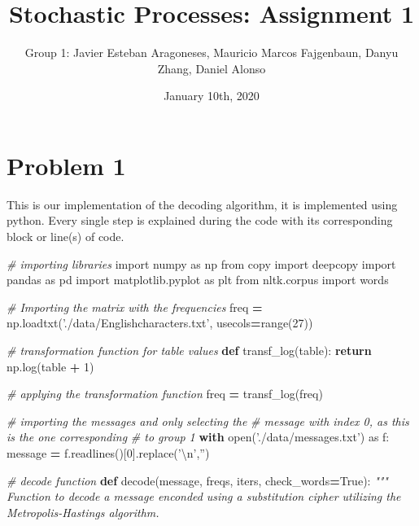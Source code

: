 \documentclass[]{article}
\title{Stochastic Processes: Assignment 1}
\author{Group 1: Javier Esteban Aragoneses, Mauricio Marcos Fajgenbaun, Danyu
Zhang, Daniel Alonso}
\date{January 10th, 2020}
\newenvironment{Shaded}{\begin{snugshade}}{\end{snugshade}}
\newcommand{\BuiltInTok}[1]{#1}
\newcommand{\CharTok}[1]{\textcolor[rgb]{0.31,0.60,0.02}{#1}}
\newcommand{\CommentTok}[1]{\textcolor[rgb]{0.56,0.35,0.01}{\textit{#1}}}
\newcommand{\ControlFlowTok}[1]{\textcolor[rgb]{0.13,0.29,0.53}{\textbf{#1}}}
\newcommand{\DecValTok}[1]{\textcolor[rgb]{0.00,0.00,0.81}{#1}}
\newcommand{\ImportTok}[1]{#1}
\newcommand{\KeywordTok}[1]{\textcolor[rgb]{0.13,0.29,0.53}{\textbf{#1}}}
\newcommand{\NormalTok}[1]{#1}
\newcommand{\OperatorTok}[1]{\textcolor[rgb]{0.81,0.36,0.00}{\textbf{#1}}}
\newcommand{\StringTok}[1]{\textcolor[rgb]{0.31,0.60,0.02}{#1}}
\newcommand{\VariableTok}[1]{\textcolor[rgb]{0.00,0.00,0.00}{#1}}
\begin{document}
\maketitle

\hypertarget{problem-1}{%
\section{Problem 1}\label{problem-1}}

This is our implementation of the decoding algorithm, it is implemented
using python. Every single step is explained during the code with its
corresponding block or line(s) of code.

\begin{Shaded}
\begin{Highlighting}[]
\CommentTok{# importing libraries}
\ImportTok{import}\NormalTok{ numpy }\ImportTok{as}\NormalTok{ np}
\ImportTok{from}\NormalTok{ copy }\ImportTok{import}\NormalTok{ deepcopy}
\ImportTok{import}\NormalTok{ pandas }\ImportTok{as}\NormalTok{ pd}
\ImportTok{import}\NormalTok{ matplotlib.pyplot }\ImportTok{as}\NormalTok{ plt}
\ImportTok{from}\NormalTok{ nltk.corpus }\ImportTok{import}\NormalTok{ words}

\CommentTok{# Importing the matrix with the frequencies}
\NormalTok{freq }\OperatorTok{=}\NormalTok{  np.loadtxt(}\StringTok{'./data/Englishcharacters.txt'}\NormalTok{, usecols}\OperatorTok{=}\BuiltInTok{range}\NormalTok{(}\DecValTok{27}\NormalTok{))}

\CommentTok{# transformation function for table values}
\KeywordTok{def}\NormalTok{ transf_log(table):}
    \ControlFlowTok{return}\NormalTok{ np.log(table }\OperatorTok{+} \DecValTok{1}\NormalTok{)}

\CommentTok{# applying the transformation function}
\NormalTok{freq }\OperatorTok{=}\NormalTok{ transf_log(freq)}

\CommentTok{# importing the messages and only selecting the }
\CommentTok{# message with index 0, as this is the one corresponding}
\CommentTok{# to group 1}
\ControlFlowTok{with} \BuiltInTok{open}\NormalTok{(}\StringTok{'./data/messages.txt'}\NormalTok{) }\ImportTok{as}\NormalTok{ f:}
\NormalTok{    message }\OperatorTok{=}\NormalTok{ f.readlines()[}\DecValTok{0}\NormalTok{].replace(}\StringTok{'}\CharTok{\textbackslash{}n}\StringTok{'}\NormalTok{,}\StringTok{''}\NormalTok{)}

\CommentTok{# decode function}
\KeywordTok{def}\NormalTok{ decode(message, freqs, iters, check_words}\OperatorTok{=}\VariableTok{True}\NormalTok{):}
    \CommentTok{"""}
\CommentTok{    Function to decode a message enconded }
\CommentTok{    using a substitution cipher utilizing the}
\CommentTok{    Metropolis-Hastings algorithm.}


\end{Highlighting}
\end{Shaded}
\end{document}
